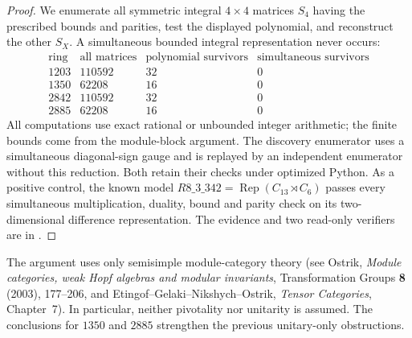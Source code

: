 \begin{proof}
We enumerate all symmetric integral $4\times4$ matrices $S_4$ having
the prescribed bounds and parities, test the displayed polynomial,
and reconstruct the other $S_X$.  A simultaneous bounded integral
representation never occurs:
\[
\begin{array}{c|r|r|r}
\text{ring}&\text{all matrices}&\text{polynomial survivors}&
\text{simultaneous survivors}\\\hline
1203&110592&32&0\\
1350&62208&16&0\\
2842&110592&32&0\\
2885&62208&16&0
\end{array}
\]
All computations use exact rational or unbounded integer arithmetic;
the finite bounds come from the module-block argument.  The discovery
enumerator uses a simultaneous diagonal-sign gauge and is replayed by
an independent enumerator without this reduction.  Both retain their
checks under optimized Python.  As a positive control, the known
model $R8\_3\_342=\operatorname{Rep}(C_{13}\rtimes C_6)$ passes every
simultaneous multiplication, duality, bound and parity check on its
two-dimensional difference representation.  The evidence and two
read-only verifiers are in
.
\end{proof}

The argument uses only semisimple module-category theory (see Ostrik,
\emph{Module categories, weak Hopf algebras and modular invariants},
Transformation Groups \textbf{8} (2003), 177--206, and
Etingof--Gelaki--Nikshych--Ostrik, \emph{Tensor Categories}, Chapter~7).
In particular, neither pivotality nor unitarity is assumed.  The
conclusions for $1350$ and $2885$ strengthen the previous unitary-only
obstructions.

